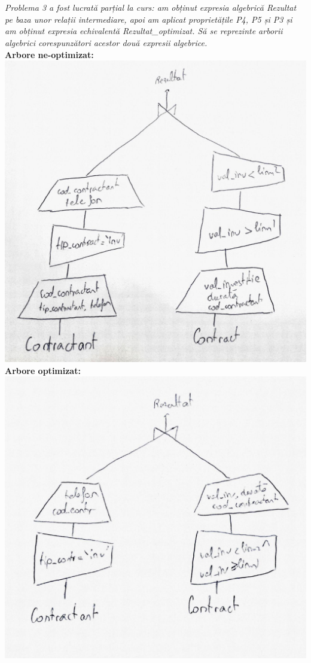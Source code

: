 \documentclass[a4paper,12pt]{article}
\begin{document}
		\newpage
		
	\section{}
		\textit{Problema 3 a fost lucrată parțial la curs: am obținut expresia algebrică Rezultat pe baza unor relații intermediare, apoi am aplicat proprietățile P4, P5 și P3 și am obținut expresia echivalentă Rezultat\_optimizat. Să se reprezinte arborii algebrici corespunzători acestor două expresii algebrice.}\\
		
		\textbf{Arbore ne-optimizat:\\}
		\includegraphics[scale=0.3]{ex_4_tree1.jpg}\\
		\newline
		\textbf{Arbore optimizat:\\}
		\includegraphics[scale=0.3]{ex_4_tree2.jpg}
		
\end{document}
